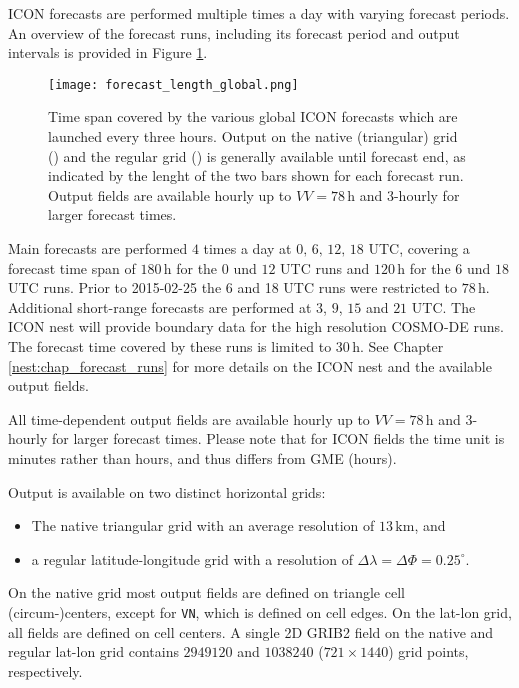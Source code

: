 ICON forecasts are performed multiple times a day with varying forecast periods. An overview of the forecast runs, including its  
forecast period and output intervals is provided in Figure \ref{fig:forecast_length_global}.
\begin{figure}[hbt]
 \centering
 \texttt{[image: forecast\_length\_global.png]}
 \caption{Time span covered by the various global ICON forecasts which are launched every three hours.
          Output on the native (triangular) grid (\protect\markRed) and the regular grid (\protect\markBlue) 
          is generally available until forecast end, as indicated by the lenght of the two bars shown for 
          each forecast run. Output fields are available hourly up to $VV=78\,\mathrm{h}$ and 3-hourly for 
          larger forecast times.}\label{fig:forecast_length_global}
\end{figure}

Main forecasts are performed $4$ times a day at $0,\, 6,\, 12,\, 18$ UTC, covering a forecast time span of $180\,\mathrm{h}$ for the 
$0$ und $12$ UTC runs and $120\,\mathrm{h}$ for the $6$ und $18$ UTC runs. Prior to 2015-02-25 the 6 and 18 UTC runs were restricted 
to $78\,\mathrm{h}$. 
Additional short-range forecasts are performed at $3$, $9$, $15$ and $21$ UTC.
The ICON nest will provide boundary data for the high resolution
COSMO-DE runs.
The forecast time covered by these runs is limited to $30\,\mathrm{h}$. See Chapter 
\ref{nest:chap_forecast_runs} for more details on the ICON nest and the available output fields. 

All time-dependent output fields are available hourly up to
$VV=78\,\mathrm{h}$ and 3-hourly for larger forecast
times\footnotemark[2].
%
Please note that for ICON fields the time unit is minutes rather than
hours, and thus differs from GME (hours).

Output is available on two distinct horizontal grids: 
\begin{itemize}
  \item The native triangular grid with an average resolution of $13\,\mathrm{km}$, and
  \item a regular latitude-longitude grid with a resolution of $\Delta \lambda = \Delta \Phi=0.25^{\circ}$. 
\end{itemize}
On the native grid most output fields are defined on triangle cell
(circum-)centers, except for \texttt{VN}, which is defined on cell
edges. On the lat-lon grid, all fields are defined on cell centers.
%
A single 2D GRIB2 field on the native and regular lat-lon grid
contains $2949120$ and $1038240$ ($721 \times 1440$) grid points, respectively.


